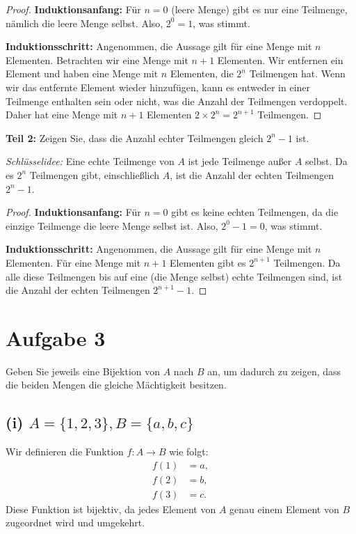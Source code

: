 \documentclass[12pt]{article}
\begin{document}
\begin{proof}
	\textbf{Induktionsanfang:} Für \( n = 0 \) (leere Menge) gibt es nur eine Teilmenge, nämlich die leere Menge selbst. Also, \( 2^0 = 1 \), was stimmt.

	\textbf{Induktionsschritt:} Angenommen, die Aussage gilt für eine Menge mit \( n \) Elementen. Betrachten wir eine Menge mit \( n+1 \) Elementen. Wir entfernen ein Element und haben eine Menge mit \( n \) Elementen, die \( 2^n \) Teilmengen hat. Wenn wir das entfernte Element wieder hinzufügen, kann es entweder in einer Teilmenge enthalten sein oder nicht, was die Anzahl der Teilmengen verdoppelt. Daher hat eine Menge mit \( n+1 \) Elementen \( 2 \times 2^n = 2^{n+1} \) Teilmengen.
\end{proof}

\textbf{Teil 2:} Zeigen Sie, dass die Anzahl echter Teilmengen gleich \( 2^n - 1 \) ist.

\textit{Schlüsselidee:} Eine echte Teilmenge von \( A \) ist jede Teilmenge außer \( A \) selbst. Da es \( 2^n \) Teilmengen gibt, einschließlich \( A \), ist die Anzahl der echten Teilmengen \( 2^n - 1 \).

\begin{proof}
	\textbf{Induktionsanfang:} Für \( n = 0 \) gibt es keine echten Teilmengen, da die einzige Teilmenge die leere Menge selbst ist. Also, \( 2^0 - 1 = 0 \), was stimmt.

	\textbf{Induktionsschritt:} Angenommen, die Aussage gilt für eine Menge mit \( n \) Elementen. Für eine Menge mit \( n+1 \) Elementen gibt es \( 2^{n+1} \) Teilmengen. Da alle diese Teilmengen bis auf eine (die Menge selbst) echte Teilmengen sind, ist die Anzahl der echten Teilmengen \( 2^{n+1} - 1 \).
\end{proof}

\section*{Aufgabe 3}

Geben Sie jeweils eine Bijektion von \(A\) nach \(B\) an, um dadurch zu zeigen, dass die beiden Mengen die gleiche Mächtigkeit besitzen.

\subsection*{(i) \( A = \{1,2,3\}, B = \{a,b,c\} \)}

Wir definieren die Funktion \( f: A \rightarrow B \) wie folgt:
\begin{align*}
	f(1) & = a, \\
	f(2) & = b, \\
	f(3) & = c.
\end{align*}
Diese Funktion ist bijektiv, da jedes Element von \( A \) genau einem Element von \( B \) zugeordnet wird und umgekehrt.
\end{document}
